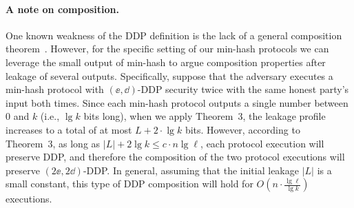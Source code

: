 \paragraph{A note on composition.} 
One known weakness of the DDP definition is the lack of a general composition theorem~\cite{FOCS:BGKS13}.  However, for the specific setting of our min-hash protocols we can leverage the small output of min-hash to argue composition properties after leakage of several outputs.
Specifically, suppose that the
adversary executes a min-hash protocol with $(\ee, \dd)$-DDP security
twice with the same honest party's input both times. Since each
min-hash protocol outputs a single number between $0$ and $k$ (i.e., $\lg k$ bits long), when we apply Theorem~3, the leakage profile increases to a total of at most $L + 2 \cdot \lg k$ bits. However, according to Theorem~3, as long as $|L| + 2 \lg k \le c \cdot n \lg \ell$, each protocol execution will preserve DDP, and therefore the composition of the two protocol executions will preserve $(2 \ee, 2\dd)$-DDP. In general, assuming that the initial leakage $|L|$ is a small constant, this type of DDP composition will hold for $O(n \cdot \frac{\lg \ell}{ \lg k })$ executions. 



